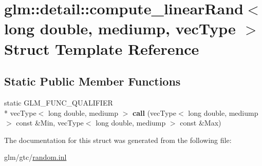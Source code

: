 \hypertarget{structglm_1_1detail_1_1compute__linearRand_3_01long_01double_00_01mediump_00_01vecType_01_4}{\section{glm\-:\-:detail\-:\-:compute\-\_\-linear\-Rand$<$ long double, mediump, vec\-Type $>$ Struct Template Reference}
\label{structglm_1_1detail_1_1compute__linearRand_3_01long_01double_00_01mediump_00_01vecType_01_4}
}
\subsection*{Static Public Member Functions}
\begin{DoxyCompactItemize}
\item 
\hypertarget{structglm_1_1detail_1_1compute__linearRand_3_01long_01double_00_01mediump_00_01vecType_01_4_a80a124d814f09a6892657886e0ae345a}{static G\-L\-M\-\_\-\-F\-U\-N\-C\-\_\-\-Q\-U\-A\-L\-I\-F\-I\-E\-R \\*
vec\-Type$<$ long double, mediump $>$ {\bfseries call} (vec\-Type$<$ long double, mediump $>$ const \&Min, vec\-Type$<$ long double, mediump $>$ const \&Max)}\label{structglm_1_1detail_1_1compute__linearRand_3_01long_01double_00_01mediump_00_01vecType_01_4_a80a124d814f09a6892657886e0ae345a}

\end{DoxyCompactItemize}


The documentation for this struct was generated from the following file\-:\begin{DoxyCompactItemize}
\item 
glm/gtc/\hyperlink{random_8inl}{random.\-inl}\end{DoxyCompactItemize}
